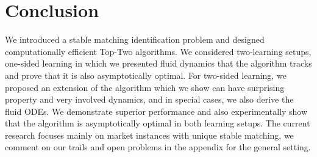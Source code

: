 \documentclass{article}
\begin{document}



\section{Conclusion}
We introduced a stable matching identification problem and designed computationally efficient Top-Two algorithms. We considered two-learning setups, one-sided learning in which we presented fluid dynamics that the algorithm tracks and prove that it is also asymptotically optimal. For two-sided learning, we proposed an extension of the algorithm which we show can have surprising property and very involved dynamics, and in special cases, we also derive the fluid ODEs. We demonstrate superior performance and also experimentally show that the algorithm is asymptotically optimal in both learning setups. The current research focuses mainly on market instances with unique stable matching, we comment on our trails and open problems in the appendix for the general setting.
\end{document}
